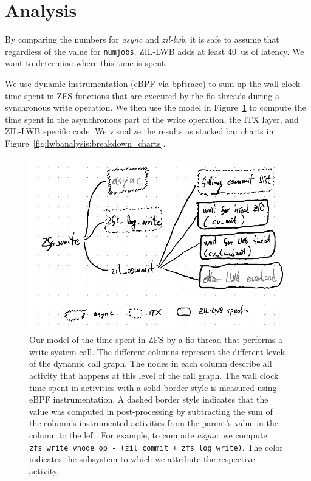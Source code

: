 \documentclass[12pt,a4paper,twoside]{book}
\begin{document}
\section{Analysis}\label{ch:lwb_analysis:breakdown}

By comparing the numbers for \textit{async} and \textit{zil-lwb}, it is safe to assume that regardless of the value for \lstinline{numjobs}, ZIL-LWB adds at least 40~us of latency.
We want to determine where this time is spent.

We use dynamic instrumentation (eBPF via bpftrace) to sum up the wall clock time spent in ZFS functions that are executed by the fio threads during a synchronous write operation.
We then use the model in Figure~\ref{fig:lwbanalysis:breakdown_model} to compute the time spent in the asynchronous part of the write operation, the ITX layer, and ZIL-LWB specific code.
We visualize the results as stacked bar charts in Figure~\ref{fig:lwbanalysis:breakdown_charts}.

\begin{figure}[H]
    \centering
    \includegraphics{fig/zil_lwb_latency_analysis__breakdown}
    \caption{Our model of the time spent in ZFS by a fio thread that performs a write system call.
    The different columns represent the different levels of the dynamic call graph.
    The nodes in each column describe all activity that happens at this level of the call graph.
    The wall clock time spent in activities with a solid border style is measured using eBPF instrumentation.
    A dashed border style indicates that the value was computed in post-processing by subtracting the sum of the column's instrumented activities from the parent's value in the column to the left.
    For example, to compute \textit{async}, we compute \lstinline{zfs_write_vnode_op - (zil_commit + zfs_log_write)}.
    The color indicates the subsystem to which we attribute the respective activity.
    }
    \label{fig:lwbanalysis:breakdown_model}
\end{figure}
\end{document}
